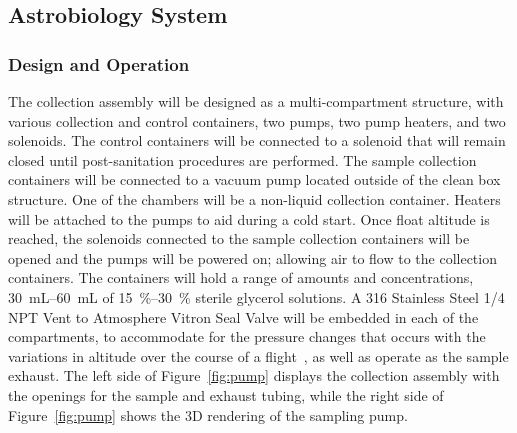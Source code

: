 \subsection{Astrobiology System}
\label{sec:Astrobiology System}

\subsubsection{Design and Operation}
The collection assembly will be designed as a multi-compartment structure, with various collection and control containers, two pumps, two pump heaters, and two solenoids.  The control containers will be connected to a solenoid that will remain closed until post-sanitation procedures are performed. The sample collection containers will be connected to a vacuum pump located outside of the clean box structure.  One of the chambers will be a non-liquid collection container. Heaters will be attached to the pumps to aid during a cold start. Once float altitude is reached, the solenoids connected to the sample collection containers will be opened and the pumps will be powered on; allowing air to flow to the collection containers. The containers will hold a range of amounts and concentrations, \SIrange{30}{60}{\milli\liter} of \SIrange{15}{30}{\%} sterile glycerol solutions. A 316 Stainless Steel \SI{1/4}{\inch} NPT Vent to Atmosphere Vitron Seal Valve will be embedded in each of the compartments, to accommodate for the pressure changes that occurs with the variations in altitude over the course of a flight~\cite{valve}, as well as operate as the sample exhaust.  The left side of Figure~\ref{fig:pump} displays the collection assembly with the openings for the sample and exhaust tubing, while the right side of Figure~\ref{fig:pump} shows the 3D rendering of the sampling pump.  

